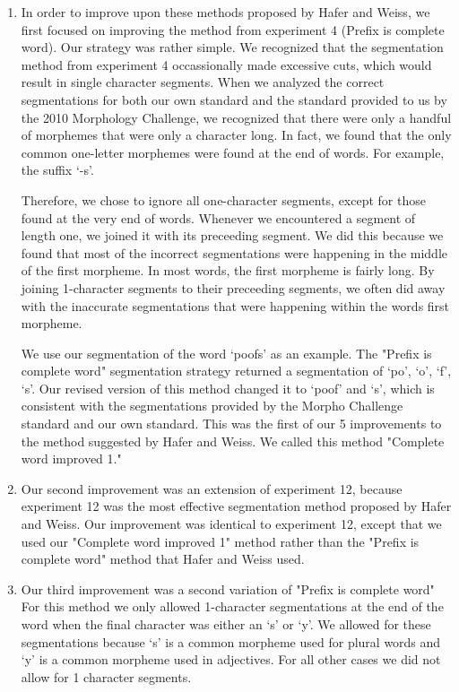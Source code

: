\documentclass[11pt,letterpaper]{article}
\begin{document}
\begin{enumerate}
  \item In order to improve upon these methods proposed by Hafer and Weiss, we first focused on improving the method from experiment 4 (Prefix is complete word). Our strategy was rather simple. We recognized that the segmentation method from experiment 4 occassionally made excessive cuts, which would result in single character segments. When we analyzed the correct segmentations for both our own standard and the standard provided to us by the 2010 Morphology Challenge, we recognized that there were only a handful of morphemes that were only a character long. In fact, we found that the only common one-letter morphemes were found at the end of words. For example, the suffix `-s'. 

Therefore, we chose to ignore all one-character segments, except for those found at the very end of words. Whenever we encountered a segment of length one, we joined it with its preceeding segment. We did this because we found that most of the incorrect segmentations were happening in the middle of the first morpheme. In most words, the first morpheme is fairly long. By joining 1-character segments to their preceeding segments, we often did away with the inaccurate segmentations that were happening within the words first morpheme. 

We use our segmentation of the word `poofs' as an example. The "Prefix is complete word" segmentation strategy returned a segmentation of `po', `o', `f', `s'. Our revised version of this method changed it to `poof' and `s', which is consistent with the segmentations provided by the Morpho Challenge standard and our own standard. This was the first of our 5 improvements to the method suggested by Hafer and Weiss. We called this method "Complete word improved 1."

\item Our second improvement was an extension of experiment 12, because experiment 12 was the most effective segmentation method proposed by Hafer and Weiss. Our improvement was identical to experiment 12, except that we used our "Complete word improved 1" method rather than the "Prefix is complete word" method that Hafer and Weiss used. 

\item Our third improvement was a second variation of "Prefix is complete word" For this method we only allowed 1-character segmentations at the end of the word when the final character was either an `s' or `y'. We allowed for these segmentations because `s' is a common morpheme used for plural words and `y' is a common morpheme used in adjectives. For all other cases we did not allow for 1 character segments. 
  

\end{enumerate}
\end{document}
